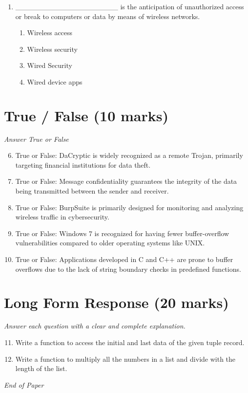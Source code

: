 \documentclass[12pt]{article}
\begin{document}
\begin{enumerate}[label=\arabic*.]
\begin{enumerate}[label=(\alph*)]
    \item Surface web
    \item Deep Web
\end{enumerate}
\item \_\_\_\_\_\_\_\_\_\_\_\_\_\_\_\_\_\_\_\_ is the anticipation of unauthorized access or break to computers or data by means of wireless networks.
\begin{enumerate}[label=(\alph*)]
    \item Wireless access
    \item Wireless security
    \item Wired Security
    \item Wired device apps
\end{enumerate}
\end{enumerate}

\section*{True / False (10 marks)}
\textit{Answer True or False}
\begin{enumerate}[label=\arabic*.]
\setcounter{enumi}{5}
\item True or False: DaCryptic is widely recognized as a remote Trojan, primarily targeting financial institutions for data theft.
\item True or False: Message confidentiality guarantees the integrity of the data being transmitted between the sender and receiver.
\item True or False: BurpSuite is primarily designed for monitoring and analyzing wireless traffic in cybersecurity.
\item True or False: Windows 7 is recognized for having fewer buffer-overflow vulnerabilities compared to older operating systems like UNIX.
\item True or False: Applications developed in C and C++ are prone to buffer overflows due to the lack of string boundary checks in predefined functions.
\end{enumerate}

\section*{Long Form Response (20 marks)}
\textit{Answer each question with a clear and complete explanation.}
\begin{enumerate}[label=\arabic*.]
\setcounter{enumi}{10}
\item Write a function to access the initial and last data of the given tuple record.
\item Write a function to multiply all the numbers in a list and divide with the length of the list.
\end{enumerate}

\vfill
\noindent\textit{End of Paper}
\end{document}
